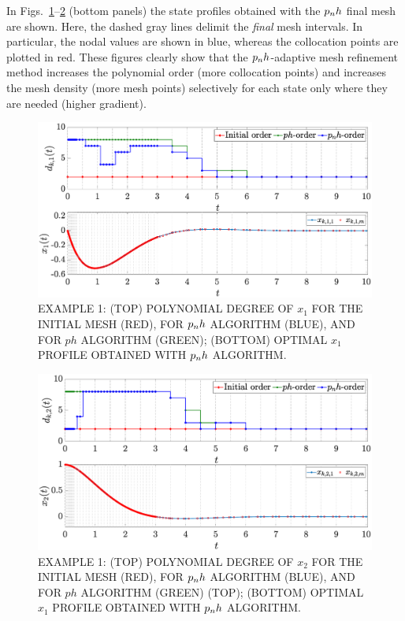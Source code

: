 In Figs.~\ref{fig:pnh1vanderpol}--\ref{fig:pnh2vanderpol} (bottom panels) the state profiles obtained with the $p_{n}h$ final mesh are shown. Here, the dashed gray lines delimit the \emph{final} mesh intervals. In particular, the nodal values are shown in blue, whereas the collocation points are plotted in red. These figures clearly show that the $p_{n}h$-adaptive mesh refinement method increases the polynomial order (more collocation points) and increases the mesh density (more mesh points) selectively for each state only where they are needed (higher gradient).
\begin{figure}[t]
	\centering
	\includegraphics[trim={1cm 0.1cm 2cm 0.5cm},clip,width=1\columnwidth]{Img/pnh1_vanderpol1}
	\caption{EXAMPLE 1:  (TOP) POLYNOMIAL DEGREE OF $x_{1}$ FOR THE INITIAL MESH (RED), FOR $p_{n}h$ ALGORITHM (BLUE), AND FOR $ph$ ALGORITHM (GREEN); (BOTTOM)
	OPTIMAL $x_1$ PROFILE OBTAINED WITH $p_{n}h$ ALGORITHM.}
	\label{fig:pnh1vanderpol}
\end{figure}
\begin{figure}[t]
	\centering
	\includegraphics[trim={1cm 0.1cm 2cm 0.5cm},clip,width=1\columnwidth]{Img/pnh2_vanderpol2}
	\caption{EXAMPLE 1: (TOP) POLYNOMIAL DEGREE OF $x_{2}$ FOR THE INITIAL MESH (RED), FOR $p_{n}h$ ALGORITHM (BLUE), AND FOR $ph$ ALGORITHM (GREEN) (TOP); (BOTTOM)
	OPTIMAL $x_1$ PROFILE OBTAINED WITH $p_{n}h$ ALGORITHM.}
	\label{fig:pnh2vanderpol}
\end{figure}

